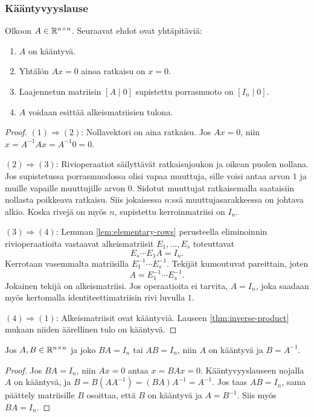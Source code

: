 \documentclass[11pt,a4paper]{amsart}
\begin{document}
  \subsubsection*{Kääntyvyyslause}

  \begin{theorem}\label{thm:invertibility}
    Olkoon $A\in\mathbb{R}^{n\times n}$. Seuraavat ehdot ovat yhtäpitäviä:
    \begin{enumerate}
      \item $A$ on kääntyvä.
      \item Yhtälön $Ax=0$ ainoa ratkaisu on $x=0$.
      \item Laajennetun matriisin $[A\mid0]$ supistettu porrasmuoto
        on $[I_n\mid0]$.
      \item $A$ voidaan esittää alkeismatriisien tulona.
    \end{enumerate}
  \end{theorem}

  \begin{proof}
    $(1)\Rightarrow(2)$: Nollavektori on aina ratkaisu. Jos $Ax=0$,
    niin $x=A^{-1}Ax=A^{-1}0=0$.

    $(2)\Rightarrow(3)$: Rivioperaatiot säilyttävät ratkaisujoukon
    ja oikean puolen nollana. Jos supistetussa porrasmuodossa olisi
    vapaa muuttuja, sille voisi antaa arvon $1$ ja muille vapaille
    muuttujille arvon $0$. Sidotut muuttujat ratkaisemalla saataisiin
    nollasta poikkeava ratkaisu. Siis jokaisessa $n$:ssä
    muuttujasarakkeessa on johtava alkio. Koska rivejä on myös $n$,
    supistettu kerroinmatriisi on $I_n$.

    $(3)\Rightarrow(4)$: Lemman \ref{lem:elementary-rows} perusteella
    eliminoinnin rivioperaatioita vastaavat alkeismatriisit
    $E_1,\ldots,E_s$ toteuttavat
    \[
      E_s\cdots E_1A=I_n.
    \]
    Kerrotaan vasemmalta matriisilla $E_1^{-1}\cdots E_s^{-1}$.
    Tekijät kumoutuvat pareittain, joten
    \[
      A=E_1^{-1}\cdots E_s^{-1}.
    \]
    Jokainen tekijä on alkeismatriisi. Jos operaatioita ei tarvita,
    $A=I_n$, joka saadaan myös kertomalla identiteettimatriisin rivi
    luvulla $1$.

    $(4)\Rightarrow(1)$: Alkeismatriisit ovat kääntyviä.
    Lauseen \ref{thm:inverse-product} mukaan niiden äärellinen tulo
    on kääntyvä.
  \end{proof}

  \begin{corollary}
    Jos $A,B\in\mathbb{R}^{n\times n}$ ja joko $BA=I_n$ tai $AB=I_n$,
    niin $A$ on kääntyvä ja $B=A^{-1}$.
  \end{corollary}
  \begin{proof}
    Jos $BA=I_n$, niin $Ax=0$ antaa $x=BAx=0$. Kääntyvyyslauseen
    nojalla $A$ on kääntyvä, ja
    $B=B(AA^{-1})=(BA)A^{-1}=A^{-1}$.
    Jos taas $AB=I_n$, sama päättely matriisille $B$ osoittaa,
    että $B$ on kääntyvä ja $A=B^{-1}$. Siis myös $BA=I_n$.
  \end{proof}
\end{document}
